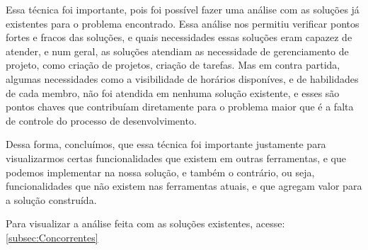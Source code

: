 Essa técnica foi importante, pois foi possível fazer uma análise com as soluções já existentes para o problema encontrado. Essa análise nos permitiu verificar pontos fortes e fracos das soluções, e quais necessidades essas soluções eram capazez de atender, e num geral, as soluções atendiam as necessidade de gerenciamento de projeto, como criação de projetos, criação de tarefas. Mas em contra partida, algumas necessidades como a visibilidade de horários disponíves, e de habilidades de cada membro, não foi atendida em nenhuma solução existente, e esses são pontos chaves que contribuíam diretamente para o problema maior que é a falta de controle do processo de desenvolvimento.

Dessa forma, concluímos, que essa técnica foi importante justamente para visualizarmos certas funcionalidades que existem em outras ferramentas, e que podemos implementar na nossa solução, e também o contrário, ou seja, funcionalidades que não existem nas ferramentas atuais, e que agregam valor para a solução construída.

Para visualizar a análise feita com as soluções existentes, acesse: \ref{subsec:Concorrentes}
